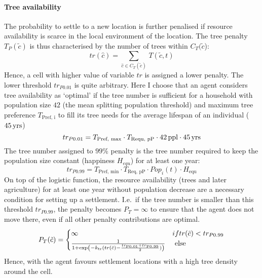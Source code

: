 \paragraph{Tree availability}
The probability to settle to a new location is further penalised if resource availability is scarce in the local environment of the location.
The tree penalty $T_P(\tilde{c})$ is thus characterised by the number of trees within $C_T(\tilde{c}$):
\begin{equation}
	tr(\hat{c}) = \sum_{\hat{c} \in C_T(\tilde{c})}\, T(\tilde{c},t)
\end{equation}
Hence, a cell with higher value of variable $tr$ is assigned a lower penalty.
The lower threshold $tr_{P0.01}$ is quite arbitrary.
Here I choose that an agent considers tree availability as `optimal' if the tree number is sufficient for a household with population size $42$ (the mean splitting population threshold) and maximum tree preference $T_\text{Pref, i}$ to fill its tree needs for the average lifespan of an individual ($45\, {\rm yrs}$)
\begin{equation}
tr_{P0.01} = T_\text{Pref, max} \cdot T_\text{Requ, pP} \cdot 42 \, {\rm ppl} \cdot 45\, {\rm yrs}
\end{equation}
The tree number assigned to $99\%$ penalty is the tree number required to keep the population size constant (happiness $H_{equ}$) for at least one year:
\begin{equation}
tr_{P0.99} = T_\text{Pref, min} \cdot T_\text{Req, pP} \cdot Pop_i(t) \cdot H_\text{equ} 
\end{equation}
On top of the logistic function, the resource availability (trees and later agriculture) for at least one year without population decrease are a necessary condition for setting up a settlement.
I.e.\ if the tree number is smaller than this threshold $tr_{P0.99}$, the penalty becomes $P_T = \infty$ to ensure that the agent does not move there, even if all other penalty contributions are optimal.
\begin{equation}
P_T(\tilde{c}) = 
\begin{cases} \infty & { if }tr(\tilde{c})< tr_{P0.99} \\
\frac{1}{1+\exp\left( - k_{\rm tr} (tr(\tilde{c})-\frac{tr_{\rm P0.01}+tr_{\rm P0.99}}{2}) \right)} & \text{ else }
\end{cases}
\end{equation}
Hence, with the agent favours settlement locations with a high tree density around the cell.


